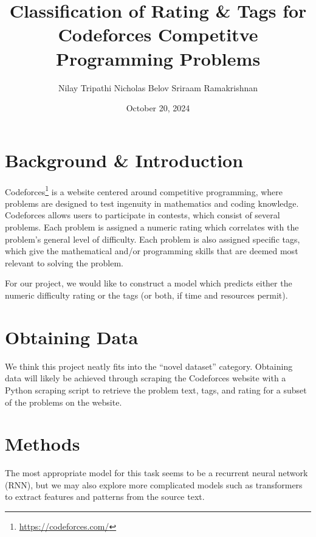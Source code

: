 \documentclass{article}
\title{Classification of Rating \& Tags for Codeforces Competitve Programming Problems}
\author{Nilay Tripathi \hspace{\authorspace} Nicholas Belov \hspace{\authorspace} Sriraam Ramakrishnan}
\date{October 20, 2024}
\begin{document}
		\maketitle

		\section{Background \& Introduction}
		Codeforces\footnote{\href{https://codeforces.com}{https://codeforces.com/}} is a website centered around competitive programming, where problems are designed to test ingenuity in mathematics and coding knowledge. Codeforces allows users to participate in contests, which consist of several problems. Each problem is assigned a numeric rating which correlates with the problem's general level of difficulty. Each problem is also assigned specific tags, which give the mathematical and/or programming skills that are deemed most relevant to solving the problem. \par 

		For our project, we would like to construct a model which predicts either the numeric difficulty rating or the tags (or both, if time and resources permit). 

		\section{Obtaining Data}
		We think this project neatly fits into the ``novel dataset'' category. Obtaining data will likely be achieved through scraping the Codeforces website with a Python scraping script to retrieve the problem text, tags, and rating for a subset of the problems on the website. 

		\section{Methods}
		The most appropriate model for this task seems to be a recurrent neural network (RNN), but we may also explore more complicated models such as transformers to extract features and patterns from the source text.
\end{document}
